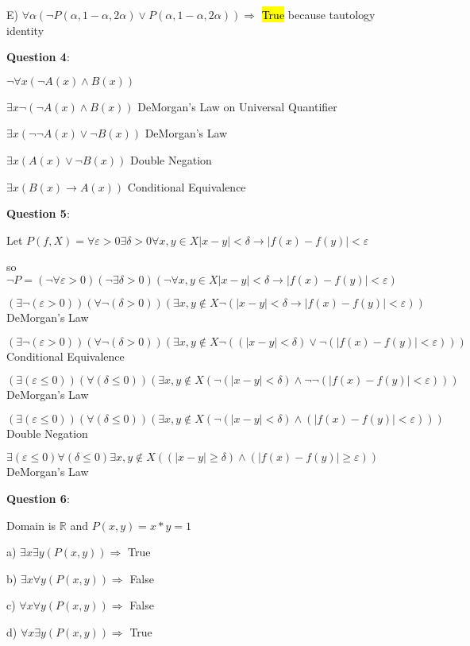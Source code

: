 \documentclass{article} %
\newcommand{\question}[2][]{\begin{flushleft}
        \textbf{Question #1}: \textit{#2}

\end{flushleft}}
\begin{document}
    E) $\forall \alpha (\neg P(\alpha, 1 - \alpha, 2 \alpha) \lor P(\alpha, 1-\alpha, 2\alpha)) \Rightarrow$ \hl{True} because tautology identity

    \question[4]{}

    $\neg \forall x (\neg A(x) \land B(x))$

    $\exists x \neg(\neg A(x) \land B(x))$ DeMorgan's Law on Universal Quantifier

    $\exists x (\neg \neg A(x) \lor \neg B(x))$ DeMorgan's Law

    $\exists x (A(x) \lor \neg B(x))$ Double Negation

    $\exists x (B(x) \rightarrow A(x))$ Conditional Equivalence

    \newpage

    \question[5]{}

    Let $P(f, X) = \forall \varepsilon > 0 \exists \delta > 0 \forall x, y \in X |x - y| < \delta \rightarrow |f(x) - f(y)| < \varepsilon$

    so $\neg P = (\neg \forall \varepsilon > 0) (\neg \exists \delta > 0) (\neg \forall x, y \in X |x - y| < \delta \rightarrow |f(x) - f(y)| < \varepsilon)$

    $(\exists \neg (\varepsilon > 0)) (\forall \neg (\delta > 0)) (\exists x, y \notin X \neg (|x - y| < \delta \rightarrow |f(x) - f(y)| < \varepsilon))$ DeMorgan's Law

    $(\exists \neg (\varepsilon > 0)) (\forall \neg (\delta > 0)) (\exists x, y \notin X \neg ((|x - y| < \delta) \lor \neg(|f(x) - f(y)| < \varepsilon)))$ Conditional Equivalence
    
    $(\exists (\varepsilon \leq 0)) (\forall  (\delta \leq 0)) (\exists x, y \notin X  (\neg (|x - y| < \delta) \land \neg \neg(|f(x) - f(y)| < \varepsilon)))$ DeMorgan's Law

    $(\exists (\varepsilon \leq 0)) (\forall  (\delta \leq 0)) (\exists x, y \notin X  (\neg (|x - y| < \delta) \land (|f(x) - f(y)| < \varepsilon)))$ Double Negation

    $\exists (\varepsilon \leq 0) \forall (\delta \leq 0) \exists x, y \notin X  ((|x - y| \geq \delta) \land (|f(x) - f(y)| \geq \varepsilon))$ DeMorgan's Law

    \question[6]{}

    Domain is $\mathbb{R}$ and $P(x, y) = x * y = 1$

    \hspace{0cm}

    a) $\exists x \exists y(P(x, y)) \Rightarrow$ True

    b) $\exists x \forall y(P(x, y)) \Rightarrow$ False

    c) $\forall x \forall y(P(x, y)) \Rightarrow$ False

    d) $\forall x \exists y(P(x, y)) \Rightarrow$ True

    
\end{document}
